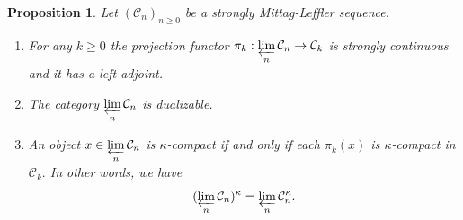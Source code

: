 \documentclass[11pt,leqno]{amsart}
\newtheorem{prop}[theo]{Proposition}
\numberwithin{equation}{section}
\newcommand{\prolim}[1][]{\mathop{\varprojlim}\limits_{#1}}
\newcommand{\cC}{{\mathcal C}}
\begin{document}
\begin{prop}\label{prop:naive_limit_dualizable} Let $(\cC_n)_{n\geq 0}$ be a strongly Mittag-Leffler sequence. 

\begin{enumerate}[label=(\roman*),ref=(\roman*)]
\item For any $k\geq 0$ the projection functor $\pi_k:\prolim[n]\cC_n\to \cC_k$ is strongly continuous and it has a left adjoint.\label{left_right_adj_to_pi_k}

\item The category $\prolim[n]\cC_n$ is dualizable. \label{naive_limit_dualizable}

\item An object $x\in \prolim[n]\cC_n$ is $\kappa$-compact if and only if each $\pi_k(x)$ is $\kappa$-compact in $\cC_k.$ In other words, we have
$$(\prolim[n]\cC_n)^{\kappa} = \prolim[n]\cC_n^{\kappa}.$$ \label{kappa_compact_in_limit} 
\end{enumerate}
\end{prop}
\end{document}
